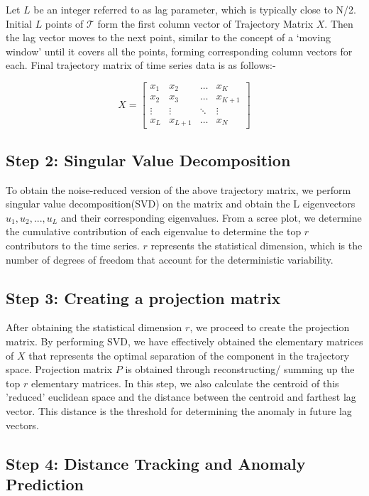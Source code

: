 Let $L$ be an integer referred to as lag parameter, which is typically close to N/2. Initial $L$ points of $\mathcal{T}$ form the first column vector of Trajectory Matrix $X$. Then the lag vector moves to the next point, similar to the concept of a `moving window' until it covers all the points, forming corresponding column vectors for each. Final trajectory matrix of time series data is as follows:-

$$
X = \begin{bmatrix}
	x_1 & x_2 & \dots  & x_K \\
	x_2 & x_3 & \dots  & x_{K+1} \\
	\vdots & \vdots & \ddots & \vdots \\
	x_L & x_{L+1} & \dots  & x_N
\end{bmatrix}
$$

\subsection*{Step 2: Singular Value Decomposition}


To obtain the noise-reduced version of the above trajectory matrix, we perform singular value decomposition(SVD) on the matrix and obtain the L eigenvectors $u_1, u_2,...,u_L$ and their corresponding eigenvalues. From a scree plot, we determine the cumulative contribution of each eigenvalue to determine the top $r$ contributors to the time series. $r$ represents the statistical dimension, which is the number of degrees of freedom that account for the deterministic variability.

\subsection*{Step 3: Creating a projection matrix}


After obtaining the statistical dimension $r$, we proceed to create the projection matrix. By performing SVD, we have effectively obtained the elementary matrices of $X$ that represents the optimal separation of the component in the trajectory space. Projection  matrix $P$ is obtained through reconstructing/ summing up the top $r$ elementary matrices\supercite{kaggle}. In this step, we also calculate the centroid of this 'reduced' euclidean space and the distance between the centroid and farthest lag vector. This distance is the threshold for determining the anomaly in future lag vectors.

\subsection*{Step 4: Distance Tracking and Anomaly Prediction}

